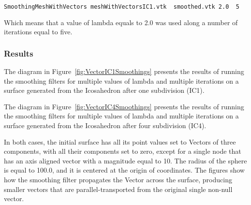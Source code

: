 \documentclass{InsightArticle}
\begin{document}
\begin{verbatim}
SmoothingMeshWithVectors meshWithVectorsIC1.vtk  smoothed.vtk 2.0  5
\end{verbatim}

Which means that a value of lambda equals to 2.0 was used along a number of
iterations equal to five.

\subsubsection{Results}

The diagram in Figure~\ref{fig:VectorIC1Smoothings} presents the results of
running the smoothing filters for multiple values of lambda and multiple
iterations on a surface generated from the Icosahedron after one subdivision
(IC1).

The diagram in Figure~\ref{fig:VectorIC4Smoothings} presents the results of
running the smoothing filters for multiple values of lambda and multiple
iterations on a surface generated from the Icosahedron after four subdivision
(IC4).

In both cases, the initial surface has all its point values set to Vectors of
three components, with all their components set to zero, except for a single
node that has an axis aligned vector with a magnitude equal to 10. The radius
of the sphere is equal to 100.0, and it is centered at the origin of
coordinates. The figures show how the smoothing filter propagates the Vector
across the surface, producing smaller vectors that are parallel-transported
from the original single non-null vector.
\end{document}
